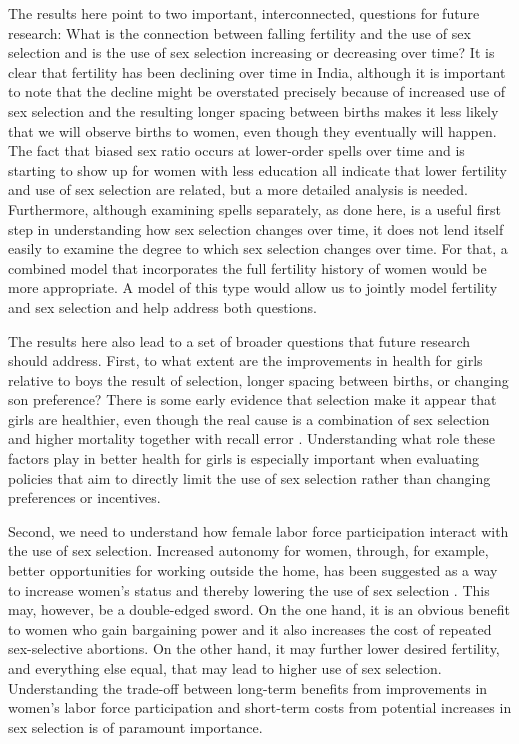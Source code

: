 \documentclass[12pt,letterpaper]{article}
\begin{document}
The results here point to two important, interconnected, questions 
for future research:
What is the connection between falling fertility and the 
use of sex selection and is the use of sex selection increasing 
or decreasing over time?
It is clear that fertility has been declining over time in India,
although it is important to note that the decline might be
overstated precisely because of increased use of sex selection and
the resulting longer spacing between births makes it less likely 
that we will observe births to women, even though they eventually
will happen.
The fact that biased sex ratio occurs at lower-order spells over
time and is starting to show up for women with less education 
all indicate that lower fertility and use of sex selection are
related, but a more detailed analysis is needed.
Furthermore, although examining spells separately, as done here, is a useful
first step in understanding how sex selection changes over time,
it does not lend itself easily to examine the degree to which
sex selection changes over time.
For that, a combined model that incorporates the full fertility
history of women would be more appropriate.
A model of this type would allow us to jointly model fertility
and sex selection and help address both questions.


The results here also lead to a set of broader questions that
future research should address.
First, to what extent are the improvements in health for girls
relative to boys the result of selection, longer spacing between
births, or changing son preference?
There is some early evidence that selection make it appear that
girls are healthier, even though the real cause is a combination
of sex selection and higher mortality together with recall error \citep{Portner2018a}. 
Understanding what role these factors play in better health for
girls is especially important when evaluating policies that 
aim to directly limit the use of sex selection rather than 
changing preferences or incentives.

Second, we need to understand how female labor force participation
interact with the use of sex selection.
Increased autonomy for women, through, for example, better opportunities
for working outside the home, has been suggested as a way to increase
women's status and thereby lowering the use of sex selection \citep{Das-Gupta2016}.
This may, however, be a double-edged sword.
On the one hand, it is an obvious benefit to women who gain  
bargaining power and it also increases the cost of repeated 
sex-selective abortions.
On the other hand, it may further lower desired fertility, and 
everything else equal, that may lead to higher use of sex selection.
Understanding the trade-off between long-term benefits from improvements in
women's labor force participation and short-term costs from potential 
increases in sex selection is of paramount importance.
\end{document}
